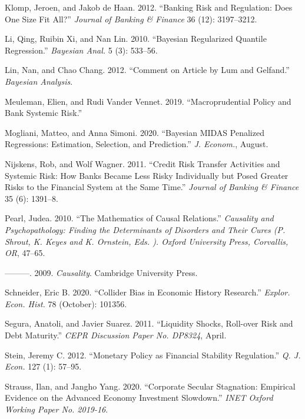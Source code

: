 \documentclass[
  10pt,
]{article}
\begin{document}
\leavevmode\hypertarget{ref-Klomp2012}{}%
Klomp, Jeroen, and Jakob de Haan. 2012. ``Banking Risk and Regulation:
Does One Size Fit All?'' \emph{Journal of Banking \& Finance} 36 (12):
3197--3212.

\leavevmode\hypertarget{ref-Li2010}{}%
Li, Qing, Ruibin Xi, and Nan Lin. 2010. ``Bayesian Regularized Quantile
Regression.'' \emph{Bayesian Anal.} 5 (3): 533--56.

\leavevmode\hypertarget{ref-Lin2012}{}%
Lin, Nan, and Chao Chang. 2012. ``Comment on Article by Lum and
Gelfand.'' \emph{Bayesian Analysis}.

\leavevmode\hypertarget{ref-Meuleman2019}{}%
Meuleman, Elien, and Rudi Vander Vennet. 2019. ``Macroprudential Policy
and Bank Systemic Risk.''

\leavevmode\hypertarget{ref-Mogliani2020}{}%
Mogliani, Matteo, and Anna Simoni. 2020. ``Bayesian MIDAS Penalized
Regressions: Estimation, Selection, and Prediction.'' \emph{J. Econom.},
August.

\leavevmode\hypertarget{ref-Nijskens2011}{}%
Nijskens, Rob, and Wolf Wagner. 2011. ``Credit Risk Transfer Activities
and Systemic Risk: How Banks Became Less Risky Individually but Posed
Greater Risks to the Financial System at the Same Time.'' \emph{Journal
of Banking \& Finance} 35 (6): 1391--8.

\leavevmode\hypertarget{ref-Pearl2010}{}%
Pearl, Judea. 2010. ``The Mathematics of Causal Relations.''
\emph{Causality and Psychopathology: Finding the Determinants of
Disorders and Their Cures (P. Shrout, K. Keyes and K. Ornstein, Eds. ).
Oxford University Press, Corvallis, OR}, 47--65.

\leavevmode\hypertarget{ref-Pearl2009}{}%
---------. 2009. \emph{Causality}. Cambridge University Press.

\leavevmode\hypertarget{ref-Schneider2020}{}%
Schneider, Eric B. 2020. ``Collider Bias in Economic History Research.''
\emph{Explor. Econ. Hist.} 78 (October): 101356.

\leavevmode\hypertarget{ref-Segura2011}{}%
Segura, Anatoli, and Javier Suarez. 2011. ``Liquidity Shocks, Roll-over
Risk and Debt Maturity.'' \emph{CEPR Discussion Paper No. DP8324},
April.

\leavevmode\hypertarget{ref-Stein2012}{}%
Stein, Jeremy C. 2012. ``Monetary Policy as Financial Stability
Regulation.'' \emph{Q. J. Econ.} 127 (1): 57--95.

\leavevmode\hypertarget{ref-Strauss2020}{}%
Strauss, Ilan, and Jangho Yang. 2020. ``Corporate Secular Stagnation:
Empirical Evidence on the Advanced Economy Investment Slowdown.''
\emph{INET Oxford Working Paper No. 2019-16}.
\end{document}
